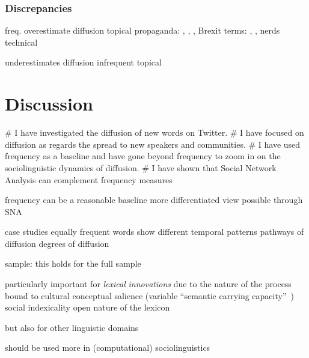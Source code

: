 \documentclass[
  a4paper,
  abstract=on,
  captions=tableabove
  ]{scrartcl}
\begin{document}
    \subsubsection{Discrepancies}

      freq.
        overestimate diffusion
          topical
          propaganda: , , , 
          Brexit terms: , , 
          nerds
          technical

        underestimates diffusion
          infrequent
          topical

\section{Discussion}
  \label{sec:discussion}


    \begin{qitem}
      # I have investigated the diffusion of new words on Twitter.
      # I have focused on diffusion as regards the spread to new speakers and communities.
      # I have used frequency as a baseline and have gone beyond frequency to zoom in on the sociolinguistic dynamics of diffusion.
      # I have shown that Social Network Analysis can complement frequency measures
    \end{qitem}


    frequency can be a reasonable baseline
    more differentiated view possible through SNA
    
      case studies
        equally frequent words show different
          temporal patterns
          pathways of diffusion
          degrees of diffusion

      sample: this holds for the full sample

    particularly important for \emph{lexical} \emph{innovations} due to the nature of the process
        bound to cultural conceptual salience (variable \enquote{semantic carrying capacity}~\parencite{Nini2017ApplicationGrowth})
        social indexicality
        open nature of the lexicon

    but also for other linguistic domains

    should be used more in (computational) sociolinguistics
\end{document}
